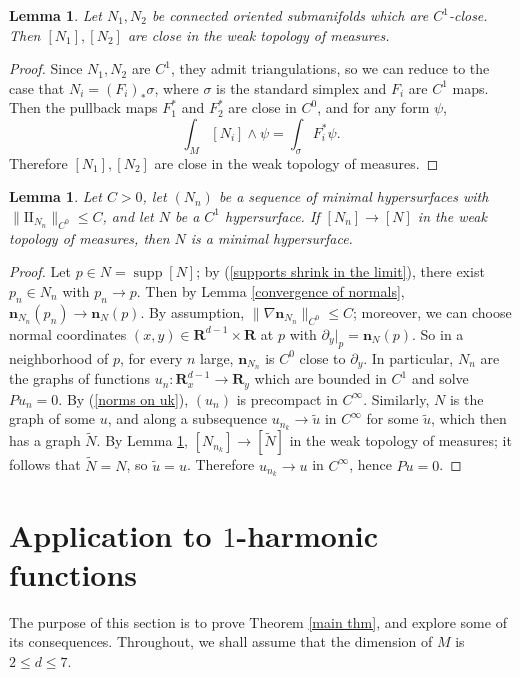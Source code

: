 \documentclass[reqno,11pt]{amsart}
\newcommand{\RR}{\mathbf{R}}
\DeclareMathOperator{\supp}{supp}
\newcommand{\Two}{\mathrm{I\!I}}
\newcommand{\normal}{\mathbf n}
\newtheorem{lemma}[theorem]{Lemma}
\theoremstyle{definition}
\numberwithin{equation}{section}
\begin{document}
\begin{lemma}\label{C1 close implies measure close}
Let $N_1, N_2$ be connected oriented submanifolds which are $C^1$-close.
Then $[N_1], [N_2]$ are close in the weak topology of measures.
\end{lemma}
\begin{proof}
Since $N_1, N_2$ are $C^1$, they admit triangulations, so we can reduce to the case that $N_i = (F_i)_* \sigma$, where $\sigma$ is the standard simplex and $F_i$ are $C^1$ maps.
Then the pullback maps $F_1^*$ and $F_2^*$ are close in $C^0$, and for any form $\psi$,
$$\int_M [N_i] \wedge \psi = \int_\sigma F^*_i \psi.$$
Therefore $[N_1], [N_2]$ are close in the weak topology of measures.
\end{proof}

\begin{lemma}\label{measured convergence is smooth convergence}
Let $C > 0$, let $(N_n)$ be a sequence of minimal hypersurfaces with $\|\Two_{N_n}\|_{C^0} \leq C$, and let $N$ be a $C^1$ hypersurface.
If $[N_n] \to [N]$ in the weak topology of measures, then $N$ is a minimal hypersurface.
\end{lemma}
\begin{proof}
Let $p \in N = \supp [N]$; by (\ref{supports shrink in the limit}), there exist $p_n \in N_n$ with $p_n \to p$.
Then by Lemma \ref{convergence of normals}, $\normal_{N_n}(p_n) \to \normal_N(p)$.
By assumption, $\|\nabla \normal_{N_n}\|_{C^0} \leq C$; moreover, we can choose normal coordinates $(x, y) \in \RR^{d - 1} \times \RR$ at $p$ with $\partial_y|_p = \normal_N(p)$.
So in a neighborhood of $p$, for every $n$ large, $\normal_{N_n}$ is $C^0$ close to $\partial_y$.
In particular, $N_n$ are the graphs of functions $u_n: \RR^{d - 1}_x \to \RR_y$ which are bounded in $C^1$ and solve $Pu_n = 0$.
By (\ref{norms on uk}), $(u_n)$ is precompact in $C^\infty$.
Similarly, $N$ is the graph of some $u$, and along a subsequence $u_{n_k} \to \tilde u$ in $C^\infty$ for some $\tilde u$, which then has a graph $\tilde N$.
By Lemma \ref{C1 close implies measure close}, $[N_{n_k}] \to [\tilde N]$ in the weak topology of measures; it follows that $\tilde N = N$, so $\tilde u = u$.
Therefore $u_{n_k} \to u$ in $C^\infty$, hence $Pu = 0$.
\end{proof}


\section{Application to \texorpdfstring{$1$-harmonic}{one-harmonic} functions}\label{1harmonic sec}
The purpose of this section is to prove Theorem \ref{main thm}, and explore some of its consequences.
Throughout, we shall assume that the dimension of $M$ is $2 \leq d \leq 7$.
\end{document}
